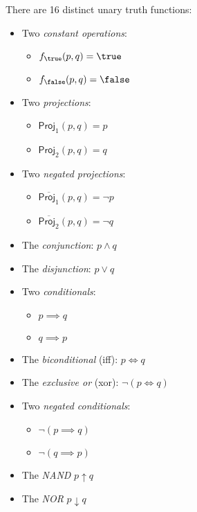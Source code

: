\begin{tcolorbox}[colframe=corcolor,title={\color{white}\bf Binary Truth Functions}]
\begin{corollary}
There are 16 distinct unary truth functions:
\begin{itemize}
\item Two \textit{constant operations}:
	\begin{itemize}
		\item $f_{\true}(p,q)=\true$
		\item $f_{\false}(p,q)=\false$
	\end{itemize}
\item Two \textit{projections}:
	\begin{itemize}
		\item $\mathsf{Proj}_1(p,q)=p$
		\item $\mathsf{Proj}_2(p,q)=q$
	\end{itemize} 
\item Two \textit{negated projections}:
	\begin{itemize}
	\item $\overline{\mathsf{Proj}_1}(p,q)=\lnot p$
	\item $\overline{\mathsf{Proj}_2}(p,q)=\lnot q$
	\end{itemize} 
\item The \textit{conjunction}: $p\land q$
\item The \textit{disjunction}: $p\lor q$
\item Two \textit{conditionals}:
	\begin{itemize}
		\item $p\implies q$
		\item $q\implies p$
	\end{itemize}
\item The \textit{biconditional} (iff): $p\iff q$
\item The \textit{exclusive or} (xor): $\lnot(p\iff q)$
\item Two \textit{negated conditionals}:
	\begin{itemize}
		\item $\lnot(p\implies q)$
		\item $\lnot(q\implies p)$
	\end{itemize}
\item The \textit{NAND} $p\uparrow q$
\item The \textit{NOR} $p\downarrow q$
\end{itemize}
\end{corollary}
\end{tcolorbox}
